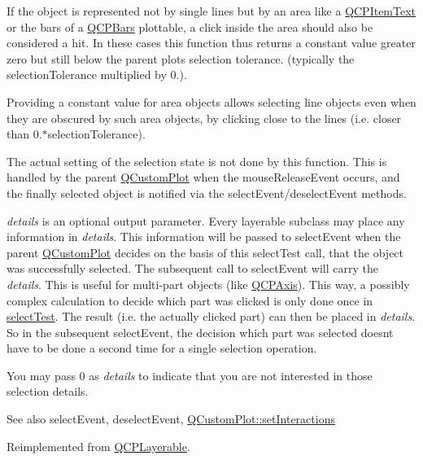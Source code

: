 If the object is represented not by single lines but by an area like a \hyperlink{class_q_c_p_item_text}{Q\+C\+P\+Item\+Text} or the bars of a \hyperlink{class_q_c_p_bars}{Q\+C\+P\+Bars} plottable, a click inside the area should also be considered a hit. In these cases this function thus returns a constant value greater zero but still below the parent plot\textquotesingle{}s selection tolerance. (typically the selection\+Tolerance multiplied by 0.).

Providing a constant value for area objects allows selecting line objects even when they are obscured by such area objects, by clicking close to the lines (i.\+e. closer than 0.$\ast$selection\+Tolerance).

The actual setting of the selection state is not done by this function. This is handled by the parent \hyperlink{class_q_custom_plot}{Q\+Custom\+Plot} when the mouse\+Release\+Event occurs, and the finally selected object is notified via the select\+Event/deselect\+Event methods.

{\itshape details} is an optional output parameter. Every layerable subclass may place any information in {\itshape details}. This information will be passed to select\+Event when the parent \hyperlink{class_q_custom_plot}{Q\+Custom\+Plot} decides on the basis of this select\+Test call, that the object was successfully selected. The subsequent call to select\+Event will carry the {\itshape details}. This is useful for multi-\/part objects (like \hyperlink{class_q_c_p_axis}{Q\+C\+P\+Axis}). This way, a possibly complex calculation to decide which part was clicked is only done once in \hyperlink{class_q_c_p_abstract_item_a96d522d10ffc0413b9a366c6f7f0476b}{select\+Test}. The result (i.\+e. the actually clicked part) can then be placed in {\itshape details}. So in the subsequent select\+Event, the decision which part was selected doesn\textquotesingle{}t have to be done a second time for a single selection operation.

You may pass 0 as {\itshape details} to indicate that you are not interested in those selection details.

\begin{DoxySeeAlso}{See also}
select\+Event, deselect\+Event, \hyperlink{class_q_custom_plot_a5ee1e2f6ae27419deca53e75907c27e5}{Q\+Custom\+Plot\+::set\+Interactions} 
\end{DoxySeeAlso}


Reimplemented from \hyperlink{class_q_c_p_layerable_a4001c4d0dfec55598efa4d531f2179a9}{Q\+C\+P\+Layerable}.



